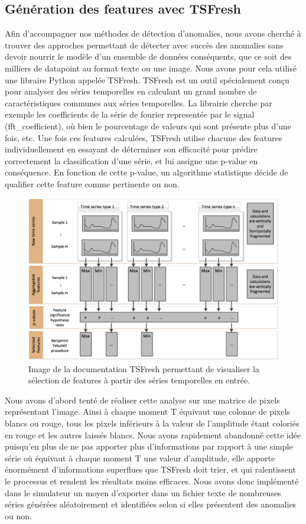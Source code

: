 \documentclass[french]{article}
\theoremstyle{mytheoremstyle}
\theoremstyle{mytheoremstyle}
\theoremstyle{myproblemstyle}
\begin{document}
        \subsection{Génération des features avec TSFresh}
        Afin d'accompagner nos méthodes de détection d'anomalies, nous avons cherché à trouver des approches permettant de détecter avec succès des anomalies sans devoir nourrir le modèle d'un ensemble de données conséquents, que ce soit des milliers de datapoint au format texte ou une image.
        Nous avons pour cela utilisé une libraire Python appelée TSFresh. TSFresh est un outil spécialement conçu pour analyser des séries temporelles en calculant un grand nombre de caractéristiques communes aux séries temporelles\cite{tsfreshfeatures}. La librairie cherche par exemple les coefficients de la série de fourier representée par le signal (fft\_coefficient), où bien le pourcentage de valeurs qui sont présente plus d'une fois, etc. Une fois ces features calculées, TSFresh utilise chacune des features individuellement en essayant de déterminer son efficacité pour prédire correctement la classification d'une série, et lui assigne une p-value en conséquence. En fonction de cette p-value, un algorithme statistique décide de qualifier cette feature comme pertinente ou non.
        
        \begin{figure}[H]
            \centering
            \includegraphics[width=.8\textwidth]{images/features_extraction.png}
            \caption{Image de la documentation TSFresh permettant de visualiser la sélection de features à partir des séries temporelles en entrée.}
            \label{}
        \end{figure}
        
        
        Nous avons d'abord tenté de réaliser cette analyse sur une matrice de pixels représentant l'image. Ainsi à chaque moment T équivaut une colonne de pixels blancs ou rouge, tous les pixels inférieurs à la valeur de l'amplitude étant coloriés en rouge et les autres laissés blancs. Nous avons rapidement abandonné cette idée puisqu'en plus de ne pas apporter plus d'informations par rapport à une simple série où équivaut à chaque moment T une valeur d'amplitude, elle apporte énormément d'informations superflues que TSFresh doit trier, et qui ralentissent le processus et rendent les résultats moins efficaces. Nous avons donc implémenté dans le simulateur un moyen d'exporter dans un fichier texte de nombreuses séries générées aléatoirement et identifiées selon si elles présentent des anomalies ou non.
        
\end{document}
